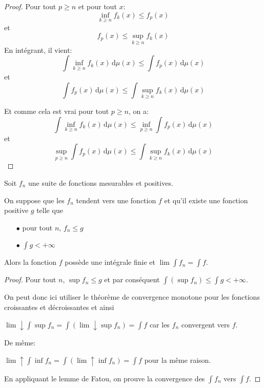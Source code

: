 \begin{proof}
Pour tout $p \geq n$ et pour tout $x$:
\[
\inf \limits_{k \geq n} f_k(x) \leq f_p(x)
\]
et
\[
f_p(x) \leq \sup \limits_{k \geq n} f_k(x)
\]
En intégrant, il vient:
\[
\displaystyle{\int} \inf \limits_{k \geq n} f_k(x) \, \mathrm d \mu(x) \leq \displaystyle{\int} f_p(x) \, \mathrm d \mu(x)
\]
et
\[
\displaystyle{\int} f_p(x) \, \mathrm d \mu(x) \leq \displaystyle{\int} \sup \limits_{k \geq n} f_k(x) \, \mathrm d \mu(x)
\]

Et comme cela est vrai pour tout $p \geq n$, on a:
\[
\displaystyle{\int} \inf \limits_{k \geq n} f_k(x) \, \mathrm d \mu(x) \leq \inf  \limits_{p \geq n} \displaystyle{\int} f_p(x) \, \mathrm d \mu(x)
\]
et
\[
\sup \limits_{p \geq n} \displaystyle{\int} f_p(x) \, \mathrm d \mu(x) \leq \displaystyle{\int} \sup \limits_{k \geq n} f_k(x) \, \mathrm d \mu(x)
\]

\end{proof}

\begin{theo}
Soit $f_n$ une suite de fonctions mesurables et positives.

On suppose que les $f_n$ tendent vers une fonction $f$ et qu'il existe une fonction positive $g$ telle que
\begin{itemize}
\item[$\bullet$] pour tout $n$, $f_n \leq g$
\item[$\bullet$] $\displaystyle{\int} g < +\infty$
\end{itemize}

Alors la fonction $f$ possède une intégrale finie et $\lim \displaystyle{\int} f_n = \displaystyle{\int} f$.
\end{theo}

\begin{proof}
Pour tout $n$, $\sup f_n \leq g$ et par conséquent $\displaystyle{\int} \left(\sup f_n\right) \leq \displaystyle{\int} g < +\infty$.

On peut donc ici utiliser le théorème de convergence monotone pour les fonctions croissantes et décroissantes et ainsi 

$\lim \downarrow \displaystyle{\int} \sup f_n = \displaystyle{\int} \left(\lim \downarrow \sup f_n\right) = \displaystyle{\int} f$ car les $f_n$ convergent vers $f$.

De même:

$\lim \uparrow \displaystyle{\int} \inf f_n = \displaystyle{\int} \left(\lim \uparrow \inf f_n\right) = \displaystyle{\int} f$ pour la même raison.

En appliquant le lemme de Fatou, on prouve la convergence des $\displaystyle{\int} f_n$ vers $\displaystyle{\int} f$.
\end{proof}

